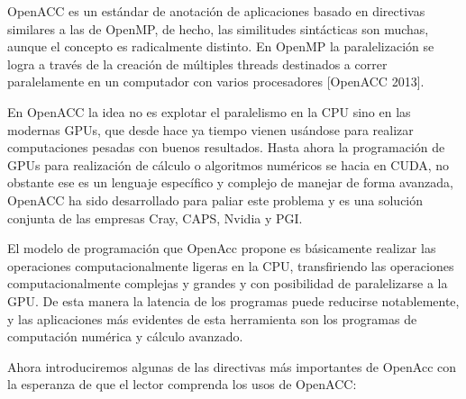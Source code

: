 OpenACC es un estándar de anotación de aplicaciones basado en directivas similares a las de OpenMP, de hecho, las similitudes sintácticas son muchas, aunque el concepto es radicalmente distinto. En OpenMP la paralelización se logra a través de la creación de múltiples threads destinados a correr paralelamente en un computador con varios procesadores [OpenACC 2013].
 
En OpenACC la idea no es explotar el paralelismo en la CPU sino en las modernas GPUs, que desde hace ya tiempo vienen usándose para realizar computaciones pesadas con buenos resultados. Hasta ahora la programación de GPUs para realización de cálculo o algoritmos numéricos se hacia en CUDA, no obstante ese es un lenguaje específico y complejo de manejar de forma avanzada, OpenACC ha sido desarrollado para paliar este problema y es una solución conjunta de las empresas Cray, CAPS, Nvidia y PGI.

El modelo de programación que OpenAcc propone es básicamente realizar las operaciones computacionalmente ligeras en la CPU, transfiriendo las operaciones computacionalmente complejas y grandes y con posibilidad de paralelizarse a la GPU. De esta manera la latencia de los programas puede reducirse notablemente, y las aplicaciones más evidentes de esta herramienta son los programas de computación numérica y cálculo avanzado.

Ahora introduciremos algunas de las directivas más importantes de OpenAcc con la esperanza de que el lector comprenda los usos de OpenACC:

